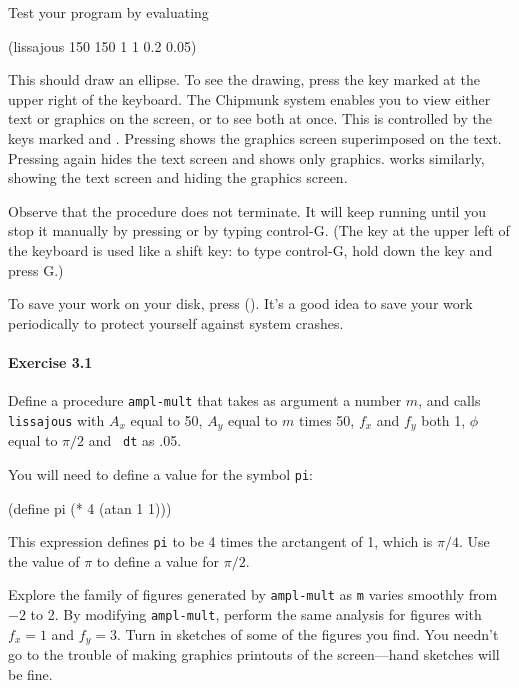 Test your program by evaluating

\beginlisp
(lissajous 150 150 1 1 0.2 0.05)
\endlisp

This should draw an ellipse.  To see the drawing, press the key marked
 at the upper right of the keyboard.  The Chipmunk
system enables you to view either text or graphics on the screen, or
to see both at once.  This is controlled by the keys marked
 and .  Pressing  shows the
graphics screen superimposed on the text.  Pressing 
again hides the text screen and shows only graphics.  
works similarly, showing the text screen and hiding the graphics
screen.

Observe that the procedure does not terminate.  It will keep running
until you stop it manually by pressing  or by typing control-G.
(The  key at the upper left of the keyboard is used like
a shift key: to type control-G, hold down the  key and
press G.)

To save your work on your disk, press { ()}.
It's a good idea to save your work periodically to protect yourself
against system crashes.


\paragraph{Exercise 3.1}
Define a procedure {\tt ampl-mult} that takes as argument a number
$m$, and calls {\tt lissajous} with $A_x$ equal to 50, $A_y$ equal to
$m$ times 50, $f_x$ and $f_y$ both 1, $\phi$ equal to $\pi/2$ and {\tt
dt} as .05.  

You will need to define a value for the symbol {\tt pi}:

\beginlisp
(define pi (* 4 (atan 1 1)))
\endlisp

\noindent
This expression defines {\tt pi} to be 4 times the arctangent of 1,
which is $\pi/4$.  Use the value of $\pi$ to define a value for $\pi/2$.

Explore the family of figures generated by {\tt ampl-mult} as {\tt m}
varies smoothly from $-2$ to 2.  By modifying {\tt ampl-mult}, perform
the same analysis for figures with $f_x=1$ and $f_y=3$.  Turn in
sketches of some of the figures you find.  You needn't go to the
trouble of making graphics printouts of the screen---hand sketches
will be fine.

